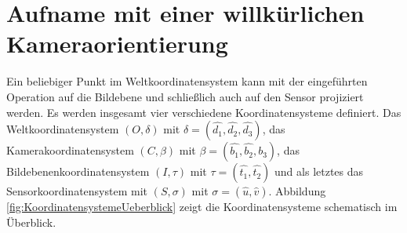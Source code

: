 
\pagebreak


\section{Aufname mit einer willkürlichen Kameraorientierung}

Ein beliebiger Punkt im Weltkoordinatensystem kann mit der eingeführten Operation auf die Bildebene und schließlich auch auf den Sensor projiziert werden. Es werden insgesamt vier verschiedene Koordinatensysteme definiert.
Das Weltkoordinatensystem $(O,\delta)$ mit $\delta =(\hat{d_1}, \hat{d_2},\hat{d_3})$, das Kamerakoordinatensystem $(C,\beta)$ mit $\beta = (\hat{b_1},\hat{b_2},\hat{b_3})$, das Bildebenenkoordinatensystem $(I,\tau)$ mit $\tau = (\hat{t_1},\hat{t_2})$ und als letztes das Sensorkoordinatensystem mit $(S,\sigma)$ mit $\sigma = (\hat{u},\hat{v})$. Abbildung \ref{fig:KoordinatensystemeUeberblick} zeigt die Koordinatensysteme schematisch im Überblick. 


